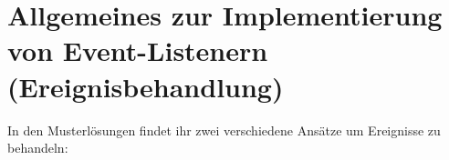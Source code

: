 \clearpage

\rehead[]{\textcolor{lightblue}{AvHG, Inf, My}}
\lohead[]{\textcolor{lightblue}{AvHG, Inf, My}}

\lstset{style=myJava}

\section[Allgemeines zur Implementierung von Event-Listenern
(Ereignisbehandlung)]{Allgemeines zur Implementierung von Event-Listenern\\
(Ereignisbehandlung)}

In den Musterlösungen findet ihr zwei verschiedene Ansätze um Ereignisse zu behandeln:

